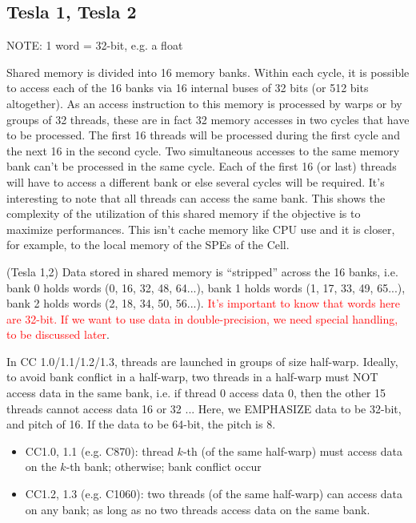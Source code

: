 \subsection{Tesla 1, Tesla 2}
\label{sec:tesla-1-tesla}

\begin{framed}
  NOTE: 1 word = 32-bit, e.g. a float
\end{framed}

Shared memory is divided into 16 memory banks. Within each cycle, it
is possible to access each of the 16 banks via 16 internal buses of 32
bits (or 512 bits altogether). As an access instruction to this memory
is processed by warps or by groups of 32 threads, these are in fact 32
memory accesses in two cycles that have to be processed. The first 16
threads will be processed during the first cycle and the next 16 in
the second cycle. Two simultaneous accesses to the same memory bank
can't be processed in the same cycle. Each of the first 16 (or last)
threads will have to access a different bank or else several cycles
will be required. It's interesting to note that all threads can access
the same bank. This shows the complexity of the utilization of this
shared memory if the objective is to maximize performances. This isn't
cache memory like CPU use and it is closer, for example, to the local
memory of the SPEs of the Cell.


(Tesla 1,2) Data stored in shared memory is ``stripped'' across the 16
banks, i.e. bank 0 holds words (0, 16, 32, 48, 64...), bank 1 holds
words (1, 17, 33, 49, 65...), bank 2 holds words (2, 18, 34, 50,
56...).
\textcolor{red}{It's important to know that words here are 32-bit. If
  we want to use data in double-precision, we need special handling,
  to be discussed later}.

In CC 1.0/1.1/1.2/1.3, threads are launched in groups of size
half-warp. Ideally, to avoid bank conflict in a half-warp, two threads
in a half-warp must NOT access data in the same bank, i.e. if thread 0
access data 0, then the other 15 threads cannot access data 16 or 32
... Here, we EMPHASIZE data to be 32-bit, and pitch of 16. If the data
to be 64-bit, the pitch is 8.

\begin{itemize}
\item CC1.0, 1.1 (e.g. C870): thread $k$-th (of the same half-warp)
  must access data on the $k$-th bank; otherwise; bank conflict occur
\item CC1.2, 1.3 (e.g. C1060): two threads (of the same half-warp) can
  access data on any bank; as long as no two threads access data on
  the same bank.
\end{itemize}

